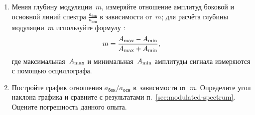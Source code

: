 \begin{lab:task}
\begin{enumerate}
\item Меняя глубину модуляции~$m$, измеряйте отношение амплитуд
боковой и основной линий спектра $\frac{a_\text{бок}}{a_\text{осн}}$
в зависимости от~$m$;
для расчёта глубины модуляции~$m$ используйте формулу :
\[
    m = \frac{A_{\rm max} - A_{\rm min}}{A_{\rm max} + A_{\rm min}},
\]
где максимальная~$A_{\rm max}$ и минимальная~$A_{\rm min}$ амплитуды сигнала
измеряются с помощью осциллографа.

\item Постройте график отношения $a_\text{бок}/a_\text{осн}$
в~зависимости от~$m$. Определите угол наклона графика и сравните
с результатами п.~\ref{sec:modulated-spectrum}. Оцените погрешность данного опыта.
\end{enumerate}

\end{lab:task}





